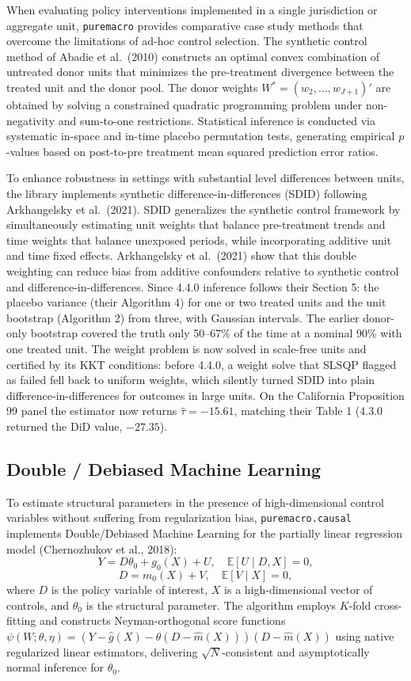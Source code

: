 \documentclass[11pt,letterpaper]{article}
\renewcommand{\_}{\pmunderscore\allowbreak}
\begin{document}
When evaluating policy interventions implemented in a single jurisdiction or aggregate unit, \texttt{puremacro} provides comparative case study methods that overcome the limitations of ad-hoc control selection. The synthetic control method of Abadie et al.~(2010) constructs an optimal convex combination of untreated donor units that minimizes the pre-treatment divergence between the treated unit and the donor pool. The donor weights \(W^* = (w_2, \dots, w_{J+1})'\) are obtained by solving a constrained quadratic programming problem under non-negativity and sum-to-one restrictions. Statistical inference is conducted via systematic in-space and in-time placebo permutation tests, generating empirical \(p\)-values based on post-to-pre treatment mean squared prediction error ratios.

To enhance robustness in settings with substantial level differences between units, the library implements synthetic difference-in-differences (SDID) following Arkhangelsky et al.~(2021). SDID generalizes the synthetic control framework by simultaneously estimating unit weights that balance pre-treatment trends and time weights that balance unexposed periods, while incorporating additive unit and time fixed effects. Arkhangelsky et al.~(2021) show that this double weighting can reduce bias from additive confounders relative to synthetic control and difference-in-differences. Since 4.4.0 inference follows their Section 5: the placebo variance (their Algorithm 4) for one or two treated units and the unit bootstrap (Algorithm 2) from three, with Gaussian intervals. The earlier donor-only bootstrap covered the truth only 50--67\% of the time at a nominal 90\% with one treated unit. The weight problem is now solved in scale-free units and certified by its KKT conditions: before 4.4.0, a weight solve that SLSQP flagged as failed fell back to uniform weights, which silently turned SDID into plain difference-in-differences for outcomes in large units. On the California Proposition 99 panel the estimator now returns \(\hat\tau = -15.61\), matching their Table 1 (4.3.0 returned the DiD value, \(-27.35\)).

\subsection{Double / Debiased Machine Learning}\label{double--debiased-machine-learning}

To estimate structural parameters in the presence of high-dimensional control variables without suffering from regularization bias, \texttt{puremacro.causal} implements Double/Debiased Machine Learning for the partially linear regression model (Chernozhukov et al., 2018):
\[Y = D \theta_0 + g_0(X) + U, \quad \mathbb{E}[U \mid D, X] = 0,\]
\[D = m_0(X) + V, \quad \mathbb{E}[V \mid X] = 0,\]
where \(D\) is the policy variable of interest, \(X\) is a high-dimensional vector of controls, and \(\theta_0\) is the structural parameter. The algorithm employs \(K\)-fold cross-fitting and constructs Neyman-orthogonal score functions \(\psi(W; \theta, \eta) = (Y - \hat{g}(X) - \theta (D - \hat{m}(X))) (D - \hat{m}(X))\) using native regularized linear estimators, delivering \(\sqrt{N}\)-consistent and asymptotically normal inference for \(\theta_0\).
\end{document}
